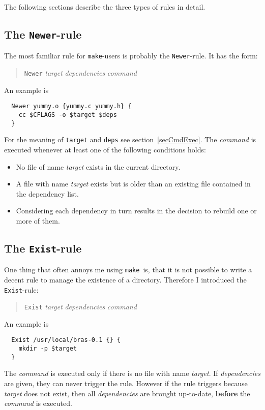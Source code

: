 \documentclass[12pt]{article}
\newcommand{\make}{\texttt{make}}
\begin{document}
The following sections describe the three types of rules in detail.

\subsection{The \texttt{Newer}-rule}
\label{secNewer}
The most familiar rule for \make-users is probably the
\texttt{Newer}-rule. It has the form:
\begin{quote}
  \texttt{Newer} \textit{target} \textit{dependencies} \textit{command}
\end{quote}
An example is
\begin{verbatim}
  Newer yummy.o {yummy.c yummy.h} {
    cc $CFLAGS -o $target $deps
  }
\end{verbatim}
For the meaning of \texttt{target} and \texttt{deps} see
section~\ref{secCmdExec}. 
The \textit{command} is executed whenever at least one of the
following conditions holds:
\begin{itemize}
\item No file of name \textit{target} exists in the current directory.
\item A file with name \textit{target} exists but is older than an
existing file contained in the dependency list.
\item Considering each dependency in turn results in the decision to
rebuild one or more of them.
\end{itemize}

\subsection{The \texttt{Exist}-rule}

One thing that often annoys me using \make\ is, that it is not
possible to write a decent rule to manage the existence of a
directory. Therefore I introduced the \texttt{Exist}-rule:
\begin{quote}
  \texttt{Exist} \textit{target} \textit{dependencies} \textit{command}
\end{quote}
An example is
\begin{verbatim}
  Exist /usr/local/bras-0.1 {} {
    mkdir -p $target
  }
\end{verbatim}
The \textit{command} is executed only if there is no file with name
\textit{target}. If \textit{dependencies} are given, they can never
trigger the rule. However if the rule triggers because \textit{target}
does not exist, then all \textit{dependencies} are brought up-to-date,
\textbf{before} the \textit{command} is executed.
\end{document}
